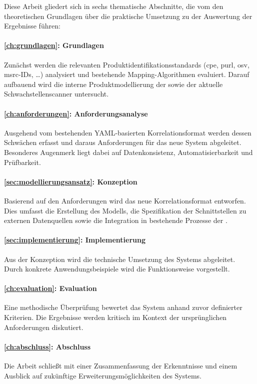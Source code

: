 Diese Arbeit gliedert sich in sechs thematische Abschnitte, die vom den theoretischen Grundlagen über die praktische Umsetzung zu der Auswertung der Ergebnisse führen:

\paragraph{\autoref{ch:grundlagen}: Grundlagen}
Zunächst werden die relevanten Produktidentifikationsstandards (\acrshort{cpe}, \acrshort{purl}, \acrshort{osv}, \acrshort{msrc}-IDs, \ldots) analysiert und bestehende Mapping-Algorithmen evaluiert.
Darauf aufbauend wird die interne Produktmodellierung der \metaeffektsp sowie der aktuelle Schwachstellenscanner untersucht.

\paragraph{\autoref{ch:anforderungen}: Anforderungsanalyse}
Ausgehend vom bestehenden YAML-basierten Korrelationsformat werden dessen Schwächen erfasst und daraus Anforderungen für das neue System abgeleitet.
Besonderes Augenmerk liegt dabei auf Datenkonsistenz, Automatisierbarkeit und Prüfbarkeit.

\paragraph{\autoref{sec:modellierungsansatz}: Konzeption}
Basierend auf den Anforderungen wird das neue Korrelationsformat entworfen.
Dies umfasst die Erstellung des Modells, die Spezifikation der Schnittstellen zu externen Datenquellen sowie die Integration in bestehende Prozesse der \metaeffekt.

\paragraph{\autoref{sec:implementierung}: Implementierung}
Aus der Konzeption wird die technische Umsetzung des Systems abgeleitet.
Durch konkrete Anwendungsbeispiele wird die Funktionsweise vorgestellt.

\paragraph{\autoref{ch:evaluation}: Evaluation}
Eine methodische Überprüfung bewertet das System anhand zuvor definierter Kriterien.
Die Ergebnisse werden kritisch im Kontext der ursprünglichen Anforderungen diskutiert.

\paragraph{\autoref{ch:abschluss}: Abschluss}
Die Arbeit schließt mit einer Zusammenfassung der Erkenntnisse und einem Ausblick auf zukünftige Erweiterungsmöglichkeiten des Systems.
